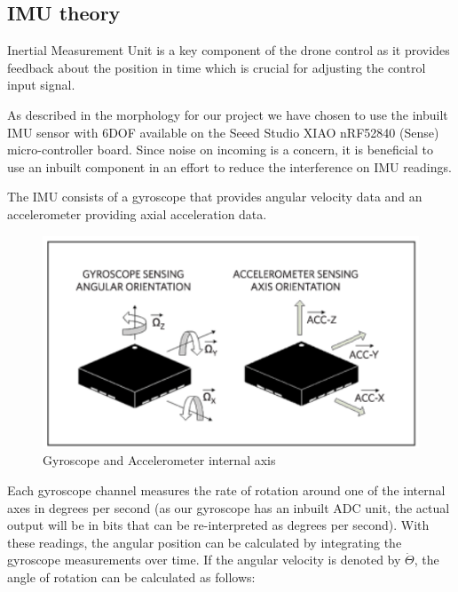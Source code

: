 \usepackage{graphicx} %
\usepackage{float}





\subsection{IMU theory}

Inertial Measurement Unit is a key component of the drone control as it provides feedback about the position in time which is crucial for adjusting the control input signal.

As described in the morphology for our project we have chosen to use the inbuilt IMU sensor with 6DOF available on the Seeed Studio XIAO nRF52840 (Sense) micro-controller board. Since noise on incoming is a concern, it is beneficial to use an inbuilt component in an effort to reduce the interference on IMU readings.

The IMU consists of a gyroscope that provides angular velocity
data and an accelerometer providing axial acceleration data.

\begin{figure}[H]
    \begin{center}
    \includegraphics[scale = 0.5]{pictures/IMU/Gyro.png}
    \end{center}
    \caption{Gyroscope and Accelerometer internal axis}
    \label{fig:my_label}
\end{figure}


Each gyroscope channel measures the rate of rotation around one of the internal axes in degrees per second (as our gyroscope has an inbuilt ADC unit, the actual output will be in bits that can be re-interpreted as degrees per second). With these readings, the angular position can be calculated by integrating the gyroscope measurements over time. If the angular velocity is denoted by $\dot{\Theta}$, the angle of rotation can be calculated as follows:

